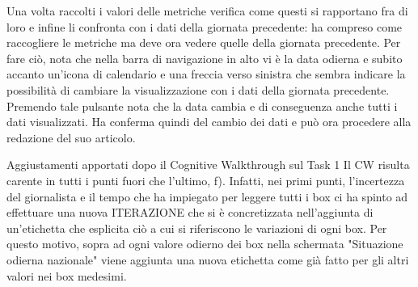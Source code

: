 Una volta raccolti i valori delle metriche verifica come questi si rapportano fra di loro e infine li confronta con i dati della giornata precedente: ha compreso come raccogliere le metriche ma deve ora vedere quelle della giornata precedente.
Per fare ciò, nota che nella barra di navigazione in alto vi è la data odierna e subito accanto un'icona di calendario e una freccia verso sinistra che sembra indicare la possibilità di cambiare la visualizzazione con i dati della giornata precedente.
Premendo tale pulsante nota che la data cambia e di conseguenza anche tutti i dati visualizzati.
Ha conferma quindi del cambio dei dati e può ora procedere alla redazione del suo articolo.

\begin{bclogo}{Aggiustamenti apportati dopo il Cognitive Walkthrough sul Task 1}
    Il CW risulta carente in tutti i punti fuori che l'ultimo, f).
    Infatti, nei primi punti, l'incertezza del giornalista e il tempo che ha impiegato per leggere tutti i box ci ha spinto ad effettuare una nuova ITERAZIONE che si è concretizzata nell'aggiunta di un'etichetta che esplicita ciò a cui si riferiscono le variazioni di ogni box.
    Per questo motivo, sopra ad ogni valore odierno dei box nella schermata "Situazione  odierna nazionale" viene aggiunta una nuova etichetta come già fatto per gli altri valori nei box medesimi.
\end{bclogo}